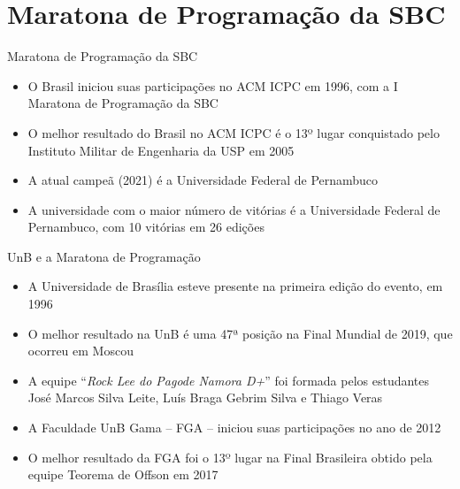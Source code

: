 \section{Maratona de Programação da SBC}

\begin{frame}[fragile]{Maratona de Programação da SBC}

    \begin{itemize}
        \item O Brasil iniciou suas participações no ACM ICPC em 1996, com a I Maratona de
            Programação da SBC
        \item O melhor resultado do Brasil no ACM ICPC é o 13º lugar conquistado pelo 
            Instituto Militar de Engenharia da USP em 2005
        \item A atual campeã (2021) é a Universidade Federal de Pernambuco
        \item A universidade com o maior número de vitórias é a Universidade Federal de
            Pernambuco, com 10 vitórias em 26 edições
    \end{itemize}

\end{frame}

\begin{frame}[fragile]{UnB e a Maratona de Programação}

    \begin{itemize}
        \item A Universidade de Brasília esteve presente na primeira edição do evento, em 1996
        \item O melhor resultado na UnB é uma 47ª posição na Final Mundial de 2019, que ocorreu
            em Moscou

        \item A equipe ``\textit{Rock Lee do Pagode Namora D+}'' foi formada pelos estudantes José Marcos 
            Silva Leite, Luís Braga Gebrim Silva e Thiago Veras

        \item A Faculdade UnB Gama -- FGA -- iniciou suas participações no ano de 2012
        \item O melhor resultado da FGA foi o 13º lugar na Final Brasileira obtido pela equipe 
            Teorema de Offson em 2017
    \end{itemize}

\end{frame}
